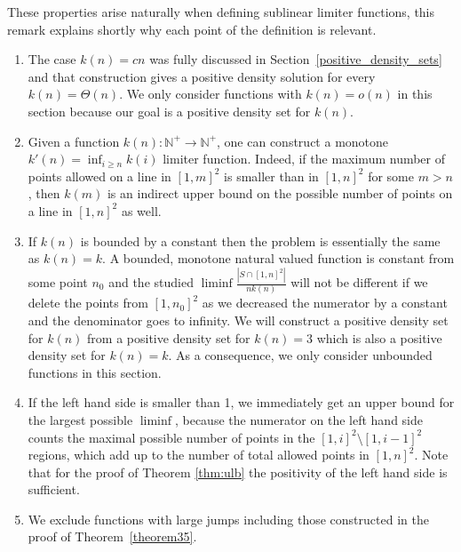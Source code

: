 \documentclass[11pt,a4paper]{article}
\numberwithin{equation}{section}
\begin{document}
\begin{remark} These properties arise naturally when defining sublinear limiter functions, this remark explains shortly why each point of the definition is relevant.
\begin{enumerate}
    \item[\ref{sublin2}] 
    The case $k(n) = cn$ was fully discussed in Section~\ref{positive_density_sets} and that construction gives a positive density solution for every $k(n)=\Theta(n)$. We only consider functions with $k(n)=o(n)$ in this section because our goal is a positive density set for $k(n)$.
    
    \item[\ref{sublin4}] Given a function $k(n): \mathbb{N}^+\to \mathbb{N^+}$, one can construct a monotone $k'(n) = \inf_{i \geq n} {k(i)}$ limiter function. Indeed, if the maximum number of points allowed on a line in $[1,m]^2$ is smaller than in $[1,n]^2$ for some $m>n$, then $k(m)$ is an indirect upper bound on the possible number of points on a line in $[1,n]^2$ as well.

    \item[\ref{sublin3}] If $k(n)$ is bounded by a constant then the problem is essentially the same as $k(n)=k$. A bounded, monotone natural valued function is constant from some point $n_0$ and the studied $\liminf \frac{|S\cap [1,n]^2|}{nk(n)}$ will not be different if we delete the points from $[1,n_0]^2$ as we decreased the numerator by a constant and the denominator goes to infinity. We will construct a positive density set for $k(n)$ from a positive density set for $k(n)=3$ which is also a positive density set for $k(n)=k$. As a consequence, we only consider unbounded functions in this section.

    \item[\ref{sublin1}] If the left hand side is smaller than 1, we immediately get an upper bound for the largest possible $\liminf$, because the numerator on the left hand side counts the maximal possible number of points in the $[1,i]^2 \setminus [1,i-1]^2 $ regions, which add up to the number of total allowed points in $[1,n]^2$. Note that for the proof of Theorem \ref{thm:ulb} the positivity of the left hand side is sufficient.

    \item[\ref{sublin5}] We exclude functions with large jumps including those constructed in the proof of Theorem~\ref{theorem35}. 
\end{enumerate}
\end{remark}
\end{document}
